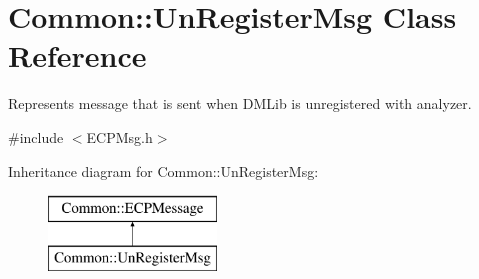 \hypertarget{class_common_1_1_un_register_msg}{\section{Common\-:\-:Un\-Register\-Msg Class Reference}
\label{class_common_1_1_un_register_msg}
}


Represents message that is sent when D\-M\-Lib is unregistered with analyzer.  




{\ttfamily \#include $<$E\-C\-P\-Msg.\-h$>$}

Inheritance diagram for Common\-:\-:Un\-Register\-Msg\-:\begin{figure}[H]
\begin{center}
\leavevmode
\includegraphics[height=2.000000cm]{class_common_1_1_un_register_msg}
\end{center}
\end{figure}
